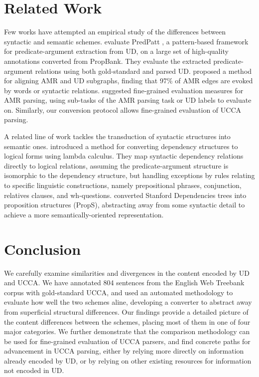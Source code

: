 \documentclass[11pt,a4paper]{article}
\begin{document}
\section{Related Work}\label{sec:related_work}

Few works have attempted an empirical study of the differences between syntactic and semantic 
schemes. 
 evaluate PredPatt \citep{white2016universal},
a pattern-based framework for predicate-argument extraction from UD,
on a large set of high-quality annotations converted from PropBank.
They evaluate the extracted predicate-argument relations using both
gold-standard and parsed UD.
 proposed a method for aligning AMR
\cite{banarescu2013abstract} and UD subgraphs,
finding that 97\% of AMR edges are evoked by words or syntactic relations.
 suggested fine-grained evaluation measures
for AMR parsing, using sub-tasks of the AMR parsing task or UD labels to evaluate on.
Similarly, our conversion protocol allows fine-grained evaluation of UCCA parsing.

A related line of work tackles the transduction of syntactic structures into semantic ones.
 introduced a method for converting dependency
structures to logical forms using lambda calculus.
They map syntactic dependency relations directly to logical relations,
assuming the predicate-argument structure is isomorphic to the dependency structure,
but handling exceptions by rules relating to specific linguistic constructions,
namely prepositional phrases, conjunction, relatives clauses, and wh-questions.
 converted Stanford Dependencies trees into
proposition structures ({\sc PropS}), abstracting away from some syntactic detail to
achieve a more semantically-oriented representation.


\section{Conclusion}\label{sec:conclusion}

We carefully examine similarities and divergences in the content encoded by UD and UCCA. We have annotated 804
sentences from the English Web Treebank corpus with gold-standard UCCA,
and used an automated methodology to
evaluate how well the two schemes aline, developing
a converter to abstract away from superficial structural
differences. Our findings provide a detailed picture of the content differences between the schemes, placing most of them
in one of four major categories. We further demonstrate that the comparison methodology can be used for fine-grained
evaluation of UCCA parsers, and find concrete paths for advancement in UCCA parsing, either by relying more directly on 
information already encoded by UD, or by relying on other existing resources for information not encoded in UD.
\end{document}
